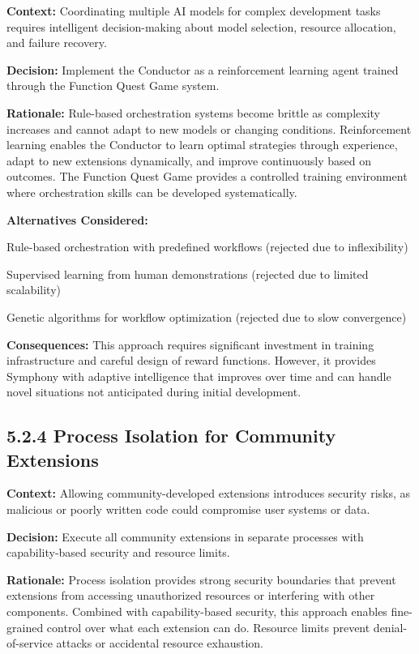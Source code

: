 \textbf{Context:} Coordinating multiple AI models for complex development tasks requires intelligent decision-making about model selection, resource allocation, and failure recovery.

\textbf{Decision:} Implement the Conductor as a reinforcement learning agent trained through the Function Quest Game system.

\textbf{Rationale:} Rule-based orchestration systems become brittle as complexity increases and cannot adapt to new models or changing conditions. Reinforcement learning enables the Conductor to learn optimal strategies through experience, adapt to new extensions dynamically, and improve continuously based on outcomes. The Function Quest Game provides a controlled training environment where orchestration skills can be developed systematically.

\textbf{Alternatives Considered:}
\begin{compactlist}
    \item Rule-based orchestration with predefined workflows (rejected due to inflexibility)
    \item Supervised learning from human demonstrations (rejected due to limited scalability)
    \item Genetic algorithms for workflow optimization (rejected due to slow convergence)
\end{compactlist}

\textbf{Consequences:} This approach requires significant investment in training infrastructure and careful design of reward functions. However, it provides Symphony with adaptive intelligence that improves over time and can handle novel situations not anticipated during initial development.

\subsection*{5.2.4 Process Isolation for Community Extensions}

\textbf{Context:} Allowing community-developed extensions introduces security risks, as malicious or poorly written code could compromise user systems or data.

\textbf{Decision:} Execute all community extensions in separate processes with capability-based security and resource limits.

\textbf{Rationale:} Process isolation provides strong security boundaries that prevent extensions from accessing unauthorized resources or interfering with other components. Combined with capability-based security, this approach enables fine-grained control over what each extension can do. Resource limits prevent denial-of-service attacks or accidental resource exhaustion.

